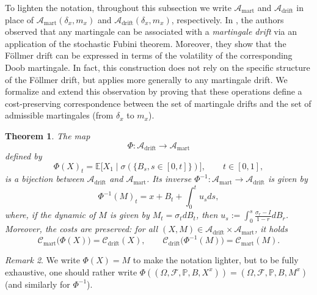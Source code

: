 \documentclass[reqno, a4paper]{amsart}
\theoremstyle{plain}
\newtheorem{theorem}{Theorem}
\theoremstyle{definition}
\theoremstyle{remark}
\newtheorem{remark}[theorem]{Remark}
\numberwithin{equation}{section}
\numberwithin{theorem}{section}
\begin{document}
	To lighten the notation, throughout this subsection we write $\mathcal A_{\mathrm{mart}}$ and $\mathcal A_{\mathrm{drift}}$ in place of $\mathcal A_{\mathrm{mart}}(\delta_x,m_x)$ and $\mathcal A_{\mathrm{drift}}(\delta_x,m_x)$, respectively. In \cite[Section 2]{ElMi20}, the authors observed that any martingale can be associated with a \emph{martingale drift} via an application of the stochastic Fubini theorem. Moreover, they show that the Föllmer drift can be expressed in terms of the volatility of the corresponding Doob martingale. In fact, this construction does not rely on the specific structure of the Föllmer drift, but applies more generally to any martingale drift. We formalize and extend this observation by proving that these operations define a cost-preserving correspondence between the set of martingale drifts and the set of admissible martingales (from $\delta_x$ to $m_x$).
	
	
	\begin{theorem}\label{them:fondamental_bijection}
		The map
		\[
		\Phi:\mathcal A_{\mathrm{drift}}\longrightarrow \mathcal A_{\mathrm{mart}}
		\]
		defined by
		\[
		\Phi(X)_t = \mathbb E\big[X_1\mid \sigma(\{B_s, s \in [0,t]\})  \big],
		\qquad t\in[0,1],
		\]
		is a bijection between $\mathcal A_{\mathrm{drift}}$ and $\mathcal A_{\mathrm{mart}}$.
		Its inverse $\Phi^{-1}:\mathcal A_{\mathrm{mart}}\to \mathcal A_{\mathrm{drift}}$
		is given by
		\begin{equation*}
			\Phi^{-1}(M)_t = x+B_t + \int_0^t  u_s ds,
		\end{equation*}
		where, if the dynamic of $M$ is given by $M_t = \sigma_t d B_t$, then
		$ u_s := \int_0^s \frac{\sigma_r - I}{1-r}dB_r$. 
		Moreover, the costs are preserved: for all $(X, M) \in  \mathcal A_{\mathrm{drift}} \times \mathcal A_{\mathrm{mart}}$, it holds
		\[
		\mathcal C_{\mathrm{mart}}\big(\Phi(X)\big)=\mathcal C_{\mathrm{drift}}(X),
		\qquad
		\mathcal C_{\mathrm{drift}}\big(\Phi^{-1}(M)\big)
		=\mathcal C_{\mathrm{mart}}(M).
		\]
	\end{theorem}
	
	\begin{remark}
		We write $\Phi(X) = M$ to make the notation lighter, but to be fully exhaustive, one should rather write $\Phi((\Omega,\mathcal{F},\mathbb{P}, B, X^x)) = (\Omega,\mathcal{F},\mathbb{P}, B, M^x)$ (and similarly for $\Phi^{-1}$).
	\end{remark}	
	
\end{document}

